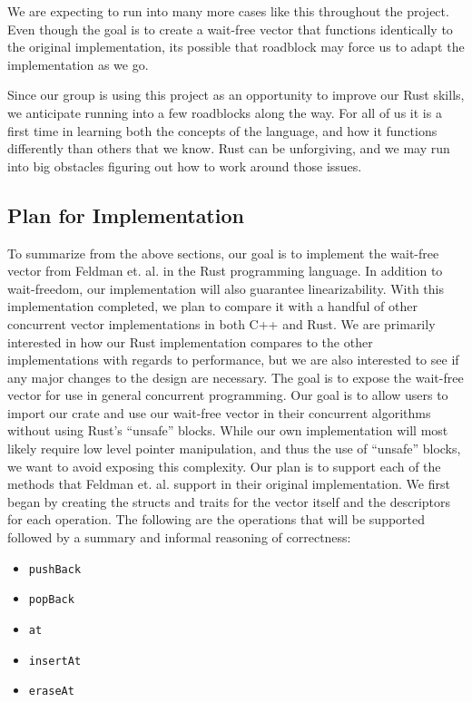 \documentclass[conference]{IEEEtran}
\begin{document}

We are expecting to run into many more cases like this throughout the project. Even though the goal is to create a wait-free vector that functions identically to the original implementation, its possible that roadblock may force us to adapt the implementation as we go.



Since our group is using this project as an opportunity to improve our Rust skills, we anticipate running into a few roadblocks along the way. For all of us it is a first time in learning both the concepts of the language, and how it functions differently than others that we know. Rust can be unforgiving, and we may run into big obstacles figuring out how to work around those issues.



\subsection{Plan for Implementation}
To summarize from the above sections, our goal is to implement the wait-free vector from Feldman et. al. \cite{main} in the Rust programming language. In addition to wait-freedom, our implementation will also guarantee linearizability. With this implementation completed, we plan to compare it with a handful of other concurrent vector implementations in both C++ and Rust. We are primarily interested in how our Rust implementation compares to the other implementations with regards to performance, but we are also interested to see if any major changes to the design are necessary.
The goal is to expose the wait-free vector for use in general concurrent programming. Our goal is to allow users to import our crate and use our wait-free vector in their concurrent algorithms without using Rust’s “unsafe” blocks. While our own implementation will most likely require low level pointer manipulation, and thus the use of “unsafe” blocks, we want to avoid exposing this complexity.
Our plan is to support each of the methods that Feldman et. al. support in their original implementation. We first began by creating the structs and traits for the vector itself and the descriptors for each operation. The following are the operations that will be supported followed by a summary and informal reasoning of correctness:
    \begin{itemize}
        \item \verb|pushBack|
        \item \verb|popBack|
        \item \verb|at|
        \item \verb|insertAt|
        \item \verb|eraseAt|
    \end{itemize}
    
\end{document}
